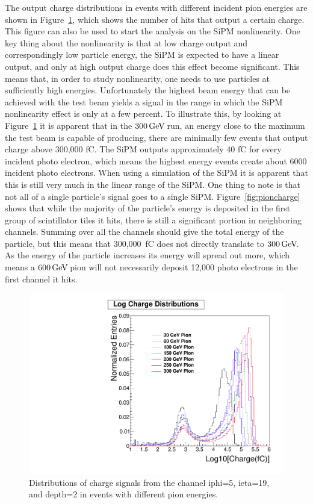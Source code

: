 The output charge distributions in events with different incident pion energies are shown in Figure~\ref{fig:Log}, which shows the number of hits that output a certain charge. This figure can also be used to start the analysis on the SiPM nonlinearity. One key thing about the nonlinearity is that at low charge output and correspondingly low particle energy, the SiPM is expected to have a linear output, and only at high output charge does this effect become significant. This means that, in order to study nonlinearity, one needs to use particles at sufficiently high energies. Unfortunately the highest beam energy that can be achieved with the test beam yields a signal in the range in which the SiPM nonlinearity effect is only at a few percent. To illustrate this, by looking at Figure~\ref{fig:Log} it is apparent that in the $300{\,\text{Ge\hspace{-.08em}V\hspace{-0.16em}}}$ run, an energy close to the maximum the test beam is capable of producing, there are minimally few events that output charge above 300,000 fC. The SiPM outputs approximately 40 fC for every incident photo electron, which means the highest energy events create about 6000 incident photo electrons. When using a simulation of the SiPM it is apparent that this is still very much in the linear range of the SiPM. One thing to note is that not all of a single particle's signal goes to a single SiPM. Figure~\ref{fig:pioncharge} shows that while the majority of the particle's energy is deposited in the first group of scintillator tiles it hits, there is still a significant portion in neighboring channels. Summing over all the channels should give the total energy of the particle, but this means that 300,000~fC does not directly translate to $300{\,\text{Ge\hspace{-.08em}V\hspace{-0.16em}}}$. As the energy of the particle increases its energy will spread out more, which means a $600{\,\text{Ge\hspace{-.08em}V\hspace{-0.16em}}}$ pion will not necessarily deposit 12,000 photo electrons in the first channel it hits.

\begin{figure}
\centering
\includegraphics[width=0.7\linewidth]{Figures/Logplot.pdf}
\caption{Distributions of charge signals from the channel iphi=5, ieta=19, and depth=2 in events with different pion energies.}
\label{fig:Log}
\end{figure}

